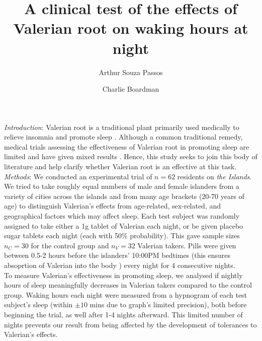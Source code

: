 \documentclass[10pt,preprintnumbers,amsmath,amssymb,floatfix,twocolumn,prl]{revtex4-2}
\begin{document}
\title{A clinical test of the effects of Valerian root on waking hours at night}
\author{Arthur Souza Passos}
\author{Charlie Boardman}

\maketitle

\textit{Introduction}: Valerian root is a traditional plant primarily used medically to relieve insomnia and promote sleep \cite{ValerianSource1}. Although a common traditional remedy, medical trials assessing the effectiveness of Valerian root in promoting sleep are limited and have given mixed results \cite{ValerianSource2}. Hence, this study seeks to join this body of literature and help clarify whether Valerian root is an effective at this task. \\

\textit{Methods}: 
We conducted an experimental trial of $n=62$ residents on \emph{the Islands}. We tried to take roughly equal numbers of male and female islanders from a variety of cities across the islands and from many age brackets (20-70 years of age) to distinguish Valerian's effects from age-related, sex-related, and geographical factors which may affect sleep. Each test subject was randomly assigned to take either a 1g tablet of Valerian each night, or be given placebo sugar tablets each night (each with 50\% probability). This gave sample sizes $n_C = 30$ for the control group and $n_V = 32$ Valerian takers. Pills were given between 0.5-2 hours before the islanders' 10:00PM bedtimes (this ensures absoprtion of Valerian into the body \cite{ValerianSource1}) every night for 4 consecutive nights. \\

To measure Valerian's effectiveness in promoting sleep, we analysed if nightly hours of sleep meaningfully decreases in Valerian takers compared to the control group. Waking hours each night were measured from a hypnogram of each test subject’s sleep (within $\pm10$ mins due to graph's limited precision), both before beginning the trial, as well after 1-4 nights afterward. This limited number of nights prevents our result from being affected by the development of tolerances to Valerian's effects. \\
\end{document}
